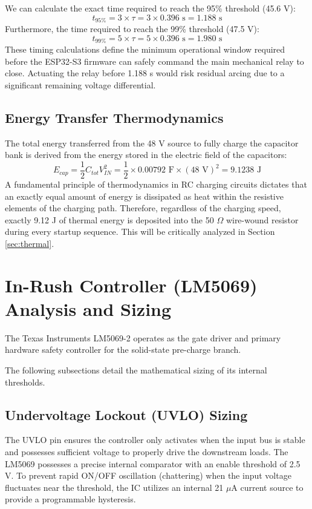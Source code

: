 \documentclass[11pt,a4paper]{article}
\begin{document}
We can calculate the exact time required to reach the 95\% threshold (45.6 V):
\begin{equation}
t_{95\%} = 3 \times \tau = 3 \times 0.396 \text{ s} = 1.188 \text{ s}
\end{equation}
Furthermore, the time required to reach the 99\% threshold (47.5 V):
\begin{equation}
t_{99\%} = 5 \times \tau = 5 \times 0.396 \text{ s} = 1.980 \text{ s}
\end{equation}
These timing calculations define the minimum operational window required before the ESP32-S3 firmware can safely command the main mechanical relay to close. Actuating the relay before 1.188 s would risk residual arcing due to a significant remaining voltage differential.

\subsection{Energy Transfer Thermodynamics}
The total energy transferred from the 48 V source to fully charge the capacitor bank is derived from the energy stored in the electric field of the capacitors:
\begin{equation}
E_{cap} = \frac{1}{2} C_{tot} V_{IN}^2 = \frac{1}{2} \times 0.00792 \text{ F} \times (48 \text{ V})^2 = 9.1238 \text{ J}
\end{equation}
A fundamental principle of thermodynamics in RC charging circuits dictates that an exactly equal amount of energy is dissipated as heat within the resistive elements of the charging path. Therefore, regardless of the charging speed, exactly 9.12 J of thermal energy is deposited into the 50 $\Omega$ wire-wound resistor during every startup sequence. This will be critically analyzed in Section \ref{sec:thermal}.

\section{In-Rush Controller (LM5069) Analysis and Sizing}

The Texas Instruments LM5069-2 operates as the gate driver and primary hardware safety controller for the solid-state pre-charge branch.

The following subsections detail the mathematical sizing of its internal thresholds.

\subsection{Undervoltage Lockout (UVLO) Sizing}
The UVLO pin ensures the controller only activates when the input bus is stable and possesses sufficient voltage to properly drive the downstream loads. The LM5069 possesses a precise internal comparator with an enable threshold of 2.5 V. To prevent rapid ON/OFF oscillation (chattering) when the input voltage fluctuates near the threshold, the IC utilizes an internal 21 $\mu$A current source to provide a programmable hysteresis. 
\end{document}
